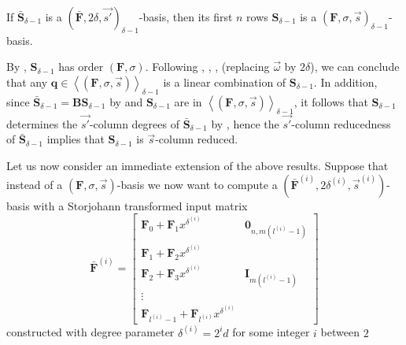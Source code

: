 \begin{lem}
\label{lem:delta-1Basis}If $\bar{\mathbf{S}}_{\delta-1}$ is a $(\bar{\mathbf{F}},2\delta,\vec{s'})_{\delta-1}$-basis,
then its first $n$ rows $\mathbf{S}_{\delta-1}$ is a $\left(\mathbf{F},\sigma,\vec{s}\right)_{\delta-1}$-basis.\end{lem}
\begin{pf}
By , $\mathbf{S}_{\delta-1}$ has order
$\left(\mathbf{F},\sigma\right)$. Following ,
, , 
(replacing $\vec{\omega}$ by $2\delta$), we can conclude that any
$\mathbf{q}\in\left\langle \left(\mathbf{F},\sigma,\vec{s}\right)\right\rangle _{\delta-1}$
is a linear combination of $\mathbf{S}_{\delta-1}$. In addition,
since $\bar{\mathbf{S}}_{\delta-1}=\mathbf{B}\mathbf{S}_{\delta-1}$
by  and $\mathbf{S}_{\delta-1}$ are
in $\left\langle \left(\mathbf{F},\sigma,\vec{s}\right)\right\rangle _{\delta-1}$,
it follows that $\mathbf{S}_{\delta-1}$ determines the $\vec{s'}$-column
degrees of $\bar{\mathbf{S}}_{\delta-1}$ by ,
hence the $\vec{s'}$-column reducedness of $\bar{\mathbf{S}}_{\delta-1}$
implies that $\mathbf{S}_{\delta-1}$ is $\vec{s}$-column reduced. 
\end{pf}
Let us now consider an immediate extension of the above results. Suppose
that instead of a $\left(\mathbf{F},\sigma,\vec{s}\right)$-basis
we now want to compute a $(\bar{\mathbf{F}}^{\left(i\right)},2\delta^{\left(i\right)},\vec{s}^{\left(i\right)})$-basis
with a Storjohann transformed input matrix \[
\bar{\mathbf{F}}^{\left(i\right)}=\left[\begin{array}{c|c}
\mathbf{F}_{0}+\mathbf{F}_{1}x^{\delta^{\left(i\right)}} & \mathbf{0}_{n,m\left(l^{\left(i\right)}-1\right)}\\
\hline \mathbf{F}_{1}+\mathbf{F}_{2}x^{\delta^{\left(i\right)}}\\
\mathbf{F}_{2}+\mathbf{F}_{3}x^{\delta^{\left(i\right)}} & \mathbf{I}_{m\left(l^{\left(i\right)}-1\right)}\\
\vdots\\
\mathbf{F}_{l^{\left(i\right)}-1}+\mathbf{F}_{l^{\left(i\right)}}x^{\delta^{\left(i\right)}}\end{array}\right]\]
 constructed with degree parameter $\delta^{\left(i\right)}=2^{i}d$
for some integer $i$ between $2$%
\begin{comment}
the base case is $i=1$ and problem is not to be subdivided 
\end{comment}
